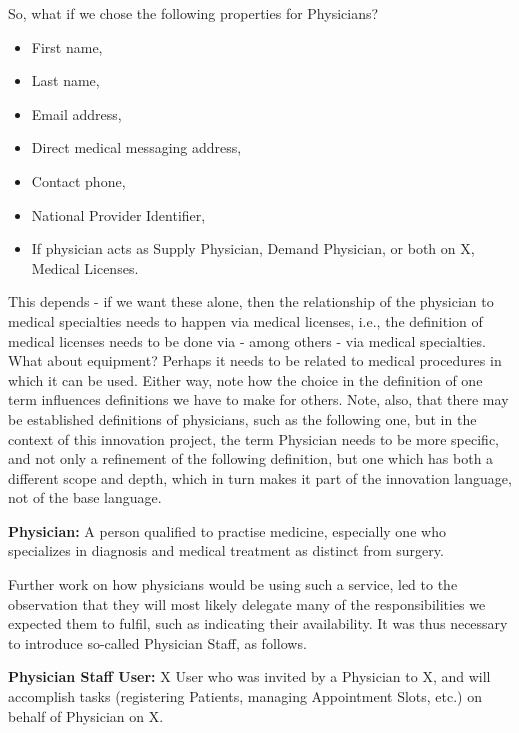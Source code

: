 \documentclass[graybox,envcountchap,sectrefs]{svmono}
\begin{document}
So, what if we chose the following properties for Physicians?
\begin{itemize}
	\item First name,
	\item Last name,
	\item Email address,
	\item Direct medical messaging address,
	\item Contact phone,
	\item National Provider Identifier,
	\item If physician acts as Supply Physician, Demand Physician, or both on X,
Medical Licenses.
\end{itemize}

This depends - if we want these alone, then the relationship of the physician to medical specialties needs to happen via medical licenses, i.e., the definition of medical licenses needs to be done via - among others - via medical specialties. What about equipment? Perhaps it needs to be related to medical procedures in which it can be used. Either way, note how the choice in the definition of one term influences definitions we have to make for others. Note, also, that there may be established definitions of physicians, such as the following one, but in the context of this innovation project, the term Physician needs to be more specific, and not only a refinement of the following definition, but one which has both a different scope and depth, which in turn makes it part of the innovation language, not of the base language.

\begin{svgraybox}
\textbf{Physician:} A person qualified to practise medicine, especially one who specializes in diagnosis and medical treatment as distinct from surgery. \cite{def-physician}
\end{svgraybox}

Further work on how physicians would be using such a service, led to the observation that they will most likely delegate many of the responsibilities we expected them to fulfil, such as indicating their availability. It was thus necessary to introduce so-called Physician Staff, as follows.

\begin{svgraybox}
\textbf{Physician Staff User:} X User who was invited by a Physician to X, and will accomplish tasks (registering Patients, managing Appointment Slots, etc.) on behalf of Physician on X.
\end{svgraybox}
\end{document}
